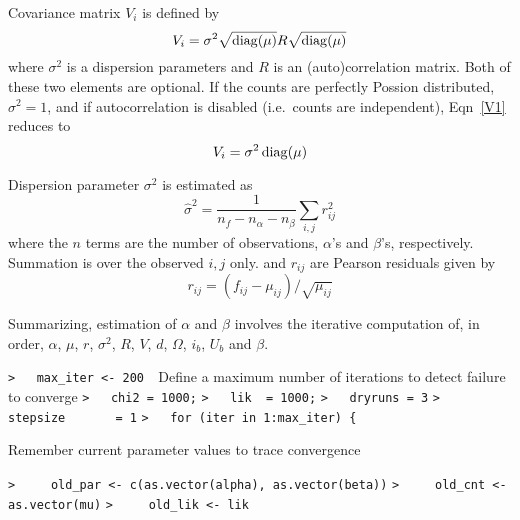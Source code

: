 \documentclass[a4paper]{article}
\begin{document}
Covariance matrix $V_i$ is defined by
\begin{equation}
  V_i = \sigma^2 \sqrt{\operatorname{diag}(\mu)} R \sqrt{\operatorname{diag}(\mu)} \label{V1}
\end{equation}
where $\sigma^2$ is a dispersion parameters and $R$ is an (auto)correlation matrix.
Both of these two elements are optional.
If the counts are perfectly Possion distributed, $\sigma^2=1$,
and if autocorrelation is disabled (i.e.\ counts are independent),
Eqn~\eqref{V1} reduces to
\begin{equation}
  V_i = \sigma^2 \operatorname{diag}(\mu) \label{V2}
\end{equation}\par

Dispersion parameter $\sigma^2$ is estimated as
\begin{equation}
  \hat{\sigma}^2 = \frac{1}{n_f - n_\alpha - n_\beta} \sum_{i,j} r_{ij}^2
\end{equation}
where the $n$ terms are the number of observations, $\alpha$'s and $\beta$'s, respectively.
Summation is over the observed $i,j$ only.
and $r_{ij}$ are Pearson residuals given by
\begin{equation}
  r_{ij} = (f_{ij} - \mu_{ij}) / \sqrt{\mu_{ij}}
\end{equation}\par

Summarizing, estimation of $\alpha$ and $\beta$ involves the iterative computation of, in order,
$\alpha$, $\mu$, $r$, $\sigma^2$, $R$, $V$, $d$, $\Omega$, $i_b$, $U_b$ and $\beta$.\par

\verb~>   max_iter <- 200  ~{\sffamily Define a maximum number of iterations to detect failure to converge}\newline
\verb~>   chi2 = 1000;~\newline
\verb~>   lik  = 1000;~\newline
\verb~>   dryruns = 3~\newline
\verb~>   stepsize       = 1~\newline
\verb~>   for (iter in 1:max_iter) {~\par

Remember current parameter values to trace convergence\par
\verb~>     old_par <- c(as.vector(alpha), as.vector(beta))~\newline
\verb~>     old_cnt <- as.vector(mu)~\newline
\verb~>     old_lik <- lik~\par
\end{document}
